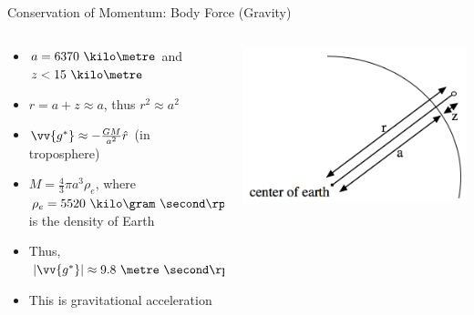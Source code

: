 \begin{frame}{Conservation of Momentum: Body Force (Gravity)}
  
\setlength{\fboxsep}{0pt}
\setlength{\fboxrule}{1pt}
\begin{columns}[T]
    \begin{column}{.58\textwidth}
    	\begin{itemize}
    		\item $a=6370\ \kilo\metre$ and $z<15\ \kilo\metre$
    		\item $r = a + z \approx a$, thus $r^2 \approx a^2$
    		\item $\vv{g^*} \approx -\frac{GM}{a^2} \hat{r}$ (in troposphere)
    		\item $M = \frac{4}{3} \pi a^3 \rho_e$, where $\rho_e = 5520\ \kilo\gram\ \second\rpsquared$ is the density of Earth
    		\item Thus, $\left|\vv{g^*}\right| \approx 9.8\ \metre\ \second\rpsquared$
    		\item This is gravitational acceleration
    	\end{itemize}	
    \end{column}
    \begin{column}{.42\textwidth}
    	\begin{minipage}[c][.4\textheight][c]{\linewidth}
    		\includegraphics[width=\textwidth]{gravity2}
    	\end{minipage}
    \end{column}
  \end{columns}
\end{frame}

